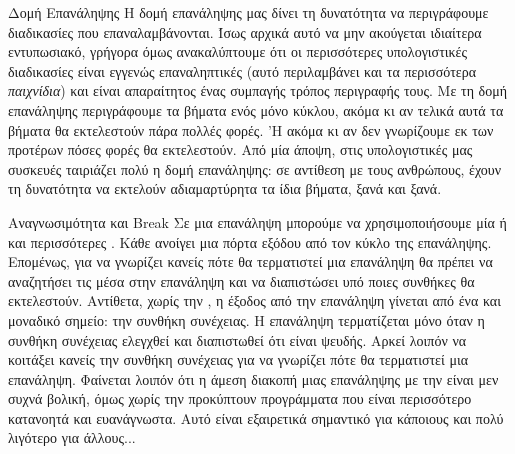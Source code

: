\documentclass[a4paper,11pt,oneside]{book}
\begin{document}

\begin{theory}{Δομή Επανάληψης}
Η δομή επανάληψης μας δίνει τη δυνατότητα να περιγράφουμε διαδικασίες που επαναλαμβάνονται. Ίσως αρχικά αυτό να μην ακούγεται ιδιαίτερα εντυπωσιακό, γρήγορα όμως ανακαλύπτουμε ότι οι περισσότερες υπολογιστικές διαδικασίες είναι εγγενώς επαναληπτικές (αυτό περιλαμβάνει και τα περισσότερα \emph{παιχνίδια}) και είναι απαραίτητος ένας συμπαγής τρόπος περιγραφής τους. Με τη δομή επανάληψης περιγράφουμε τα βήματα ενός μόνο κύκλου, ακόμα κι αν τελικά αυτά τα βήματα θα εκτελεστούν πάρα πολλές φορές. 'Η ακόμα κι αν δεν γνωρίζουμε εκ των προτέρων πόσες φορές θα εκτελεστούν. Από μία άποψη, στις υπολογιστικές μας συσκευές ταιριάζει πολύ η δομή επανάληψης: σε αντίθεση με τους ανθρώπους, έχουν τη δυνατότητα να εκτελούν αδιαμαρτύρητα τα ίδια βήματα, ξανά και ξανά.
\end{theory}

\begin{theory}{Αναγνωσιμότητα και Break}
Σε μια επανάληψη μπορούμε να χρησιμοποιήσουμε μία ή και περισσότερες . Κάθε  ανοίγει μια πόρτα εξόδου από τον κύκλο της επανάληψης. Επομένως, για να γνωρίζει κανείς πότε θα τερματιστεί μια επανάληψη θα πρέπει να αναζητήσει τις  μέσα στην επανάληψη και να διαπιστώσει υπό ποιες συνθήκες θα εκτελεστούν. Αντίθετα, χωρίς την , η έξοδος από την επανάληψη γίνεται από ένα και μοναδικό σημείο: την συνθήκη συνέχειας. Η επανάληψη τερματίζεται μόνο όταν η συνθήκη συνέχειας ελεγχθεί και διαπιστωθεί ότι είναι ψευδής. Αρκεί λοιπόν να κοιτάξει κανείς την συνθήκη συνέχειας για να γνωρίζει πότε θα τερματιστεί μια επανάληψη. Φαίνεται λοιπόν ότι η άμεση διακοπή μιας επανάληψης με την  είναι μεν συχνά βολική, όμως χωρίς την  προκύπτουν προγράμματα που είναι περισσότερο κατανοητά και ευανάγνωστα. Αυτό είναι εξαιρετικά σημαντικό για κάποιους και πολύ λιγότερο για άλλους...
\end{theory}
\end{document}
